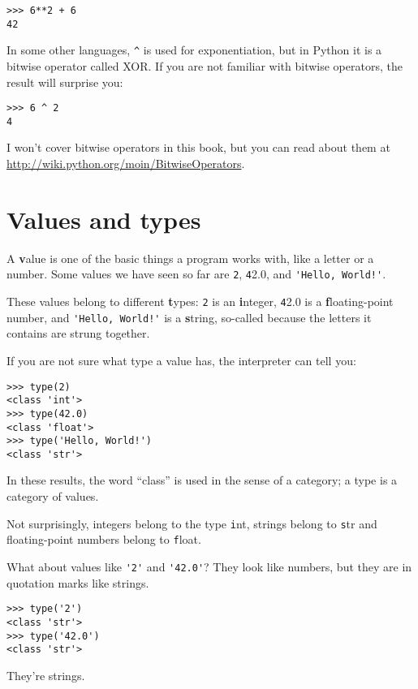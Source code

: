 \documentclass[
DIV=11,
fontsize=13,
twoside,
headinclude=false,
titlepage=firstiscover,
abstract=true,
headsepline=true,
footsepline=true,
chapterprefix=true, %
headings=big,
bibliography=totoc,%
captions=tableheading
]{scrbook}
\theoremstyle{definition}
\begin{document}
\begin{lstlisting}
>>> 6**2 + 6
42
\end{lstlisting}
%
In some other languages, \verb"^" is used for exponentiation, but
in Python it is a bitwise operator called XOR.  If you are not
familiar with bitwise operators, the result will surprise you:

\begin{lstlisting}
>>> 6 ^ 2
4
\end{lstlisting}
%
I won't cover
bitwise operators in this book, but you can read about
them at \url{http://wiki.python.org/moin/BitwiseOperators}.


\section{Values and types}

A {\textbf value} is one of the basic things a program works with, like a
letter or a number.  Some values we have seen so far are {\texttt 2},
{\texttt 42.0}, and \verb"'Hello, World!'".

These values belong to different {\textbf types}:
{\texttt 2} is an {\textbf integer}, {\texttt 42.0} is a {\textbf floating-point number},
and \verb"'Hello, World!'" is a {\textbf string},
so-called because the letters it contains are strung together.

If you are not sure what type a value has, the interpreter can
tell you:

\begin{lstlisting}
>>> type(2)
<class 'int'>
>>> type(42.0)
<class 'float'>
>>> type('Hello, World!')
<class 'str'>
\end{lstlisting}
%
In these results, the word ``class'' is used in the sense of
a category; a type is a category of values.

Not surprisingly, integers belong to the type {\texttt int},
strings belong to {\texttt str} and floating-point
numbers belong to {\texttt float}.  

What about values like \verb"'2'" and \verb"'42.0'"?
They look like numbers, but they are in quotation marks like
strings.

\begin{lstlisting}
>>> type('2')
<class 'str'>
>>> type('42.0')
<class 'str'>
\end{lstlisting}
%
They're strings.
\end{document}
